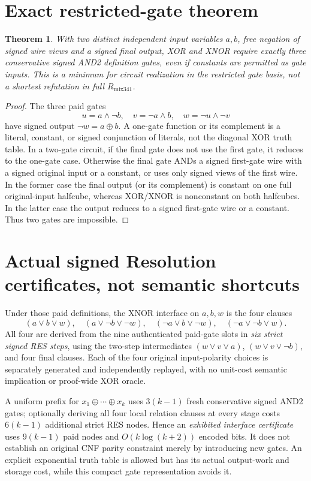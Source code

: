 \documentclass[11pt]{article}
\newtheorem{theorem}{Theorem}
\begin{document}
\section*{Exact restricted-gate theorem}
\begin{theorem}
With two distinct independent input variables \(a,b\), free negation of signed wire \emph{views} and a signed final output, XOR and XNOR require exactly three conservative signed AND2 definition gates, even if constants are permitted as gate inputs. This is a minimum for \emph{circuit realization in the restricted gate basis}, not a shortest refutation in full \(R_{\mathrm{mix341}}\).
\end{theorem}
\begin{proof}
The three paid gates
\[
u=a\land\neg b,\quad v=\neg a\land b,\quad w=\neg u\land\neg v
\]
have signed output \(\neg w=a\oplus b\). A one-gate function or its complement is a literal, constant, or signed conjunction of literals, not the diagonal XOR truth table. In a two-gate circuit, if the final gate does not use the first gate, it reduces to the one-gate case. Otherwise the final gate ANDs a signed first-gate wire with a signed original input or a constant, or uses only signed views of the first wire. In the former case the final output (or its complement) is constant on one full original-input halfcube, whereas XOR/XNOR is nonconstant on both halfcubes. In the latter case the output reduces to a signed first-gate wire or a constant. Thus two gates are impossible.
\end{proof}

\section*{Actual signed Resolution certificates, not semantic shortcuts}
Under those paid definitions, the XNOR interface on \(a,b,w\) is the four clauses
\[
(a\vee b\vee w),\quad(a\vee\neg b\vee\neg w),\quad
(\neg a\vee b\vee\neg w),\quad(\neg a\vee\neg b\vee w).
\]
All four are derived from the nine authenticated paid-gate slots in \emph{six strict signed RES steps}, using the two-step intermediates \((w\vee v\vee a)\), \((w\vee v\vee\neg b)\), and four final clauses. Each of the four original input-polarity choices is separately generated and independently replayed, with no unit-cost semantic implication or proof-wide XOR oracle.

A uniform prefix for \(x_1\oplus\cdots\oplus x_k\) uses \(3(k-1)\) fresh conservative signed AND2 gates; optionally deriving all four local relation clauses at every stage costs \(6(k-1)\) additional strict RES nodes. Hence an \emph{exhibited interface certificate} uses \(9(k-1)\) paid nodes and \(O(k\log(k+2))\) encoded bits. It does not establish an original CNF parity constraint merely by introducing new gates. An explicit exponential truth table is allowed but has its actual output-work and storage cost, while this compact gate representation avoids it.
\end{document}
